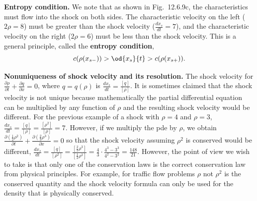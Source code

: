 \textbf{Entropy condition.}  We note that as shown in Fig.~12.6.9c, the characteristics must flow into the shock on both sides.  The characteristic velocity on the left ($2\rho = 8$) must be greater than the shock velocity ($\frac{dx_s}{dt} = 7$), and the characteristic velocity on the right ($2\rho = 6$) must be less than the shock velocity.  This is a general principle, called the \textbf{entropy condition},
\begin{equation}
\label{eq:12.6.23}
c(\rho(x_{s-})) > \od{x_s}{t} > c(\rho(x_{s+})).
\end{equation}

\textbf{Nonuniqueness of shock velocity and its resolution.}  The shock velocity for $\frac{\partial\rho}{\partial t} + \frac{\partial q}{\partial x} = 0$, where $q = q(\rho)$ is $\frac{dx_s}{dt} = \frac{[q]}{[\rho]}$.  It is sometimes claimed that the shock velocity is not unique because mathematically the partial differential equation can be multiplied by any function of $\rho$ and the resulting shock velocity would be different.  For the previous example of a shock with $\rho = 4$ and $\rho = 3$, $\frac{dx_s}{dt} = \frac{[q]}{[\rho]} = \frac{[\rho^2]}{[\rho]} = 7$.  However, if we multiply the pde by $\rho$, we obtain $\frac{\partial(\frac{1}{2}\rho^2)}{\partial t} + \frac{\partial(\frac{2}{3}\rho^3)}{\partial x} = 0$ so that the shock velocity assuming $\rho^2$ is conserved would be different, $\frac{dx_s}{dt} = \frac{[q]}{[\rho^2]} = \frac{[\frac{2}{3}\rho^3]}{[\frac{1}{2}\rho^2]} = \frac{4}{3}\cdot\frac{4^3-3^3}{4^2-3^2} = \frac{148}{21}$.  However, the point of view we wish to take is that only one of the conservation laws is the correct conservation law from physical principles.  For example, for traffic flow problems $\rho$ not $\rho^2$ is the conserved quantity and the shock velocity formula can only be used for the density that is physically conserved.

